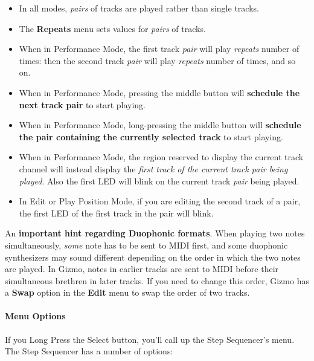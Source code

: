 \documentclass{article}
\begin{document}
\begin{itemize} 
\item In all modes, {\it pairs} of tracks are played rather than single tracks.
\item The {\bf Repeats} menu sets values for {\it pairs} of tracks.  
\item When in Performance Mode, the first track {\it pair} will play {\it repeats} number of times: then the second track {\it pair} will play {\it repeats} number of times, and so on.
\item When in Performance Mode, pressing the middle button will {\bf schedule the next track pair} to start playing.
\item When in Performance Mode, long-pressing the middle button will {\bf schedule the pair containing the currently selected track} to start playing.
\item When in Performance Mode, the region reserved to display the current track channel will instead display the {\it first track of the current track pair being played}. Also the first LED will blink on the current track {\it pair} being played.
\item In Edit or Play Position Mode, if you are editing the second track of a pair, the first LED of the first track in the pair will blink.
\end{itemize}

An {\bf important hint regarding Duophonic formats}.  When playing two notes simultaneously, {\it some} note has to be sent to MIDI first, and some duophonic synthesizers may sound different depending on the order in which the two notes are played.  In Gizmo, notes in earlier tracks are sent to MIDI before their simultaneous brethren in later tracks.  If you need to change this order, Gizmo has a {\bf Swap} option in the {\bf Edit} menu to swap the order of two tracks.



\paragraph{Menu Options}

If you Long Press the Select button, you'll call up the Step Sequencer's menu.  The Step Sequencer has a number of options:
\end{document}
